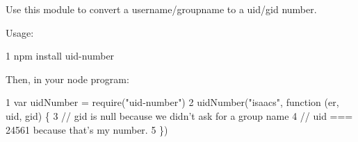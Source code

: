 Use this module to convert a username/groupname to a uid/gid number.

Usage\+:


\begin{DoxyCode}
1 npm install uid-number
\end{DoxyCode}


Then, in your node program\+:


\begin{DoxyCode}
1 var uidNumber = require("uid-number")
2 uidNumber("isaacs", function (er, uid, gid) \{
3   // gid is null because we didn't ask for a group name
4   // uid === 24561 because that's my number.
5 \})
\end{DoxyCode}
 